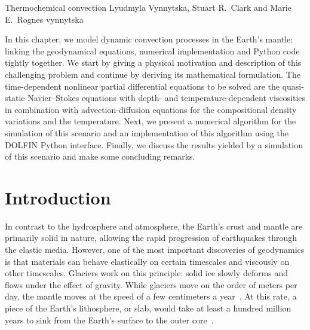               {Thermochemical convection}
              {Lyudmyla Vynnytska,  Stuart R.~Clark and Marie E.~Rognes}
              {vynnytska}

\newcommand{\erf}{\mathrm{erf}}
\newcommand{\expc}{\mathrm{erf}}
\newcommand{\composition}{\phi}
\newcommand{\test}{\psi}
\newcommand{\triang}{\mathcal{T}}
\newcommand{\jump}[1]{[[#1]]}
\newcommand{\avg}[1]{\{#1\}}
\newcommand{\code}[1]{$\texttt{#1}$}

In this chapter, we model dynamic convection processes in the Earth's
mantle: linking the geodynamical equations, numerical implementation
and Python code tightly together. We start by giving a physical
motivation and description of this challenging problem and continue by
deriving its mathematical formulation. The time-dependent nonlinear
partial differential equations to be solved are the quasi-static
Navier--Stokes equations with depth- and temperature-dependent
viscosities in combination with advection-diffusion equations for the
compositional density variations and the temperature. Next, we present
a numerical algorithm for the simulation of this scenario and an
implementation of this algorithm using the DOLFIN Python
interface. Finally, we discuss the results yielded by a simulation of
this scenario and make some concluding remarks.


\section{Introduction}

In contrast to the hydrosphere and atmosphere, the Earth's crust and
mantle are primarily solid in nature, allowing the rapid progression
of earthquakes through the elastic media.  However, one of the most
important discoveries of geodynamics is that materials can behave
elastically on certain timescales and viscously on other
timescales. Glaciers work on this principle: solid ice slowly deforms
and flows under the effect of gravity.  While glaciers move on the
order of meters per day, the mantle moves at the speed of a few
centimeters a year~\citep{vanderMeer2010}.  At this rate, a piece of
the Earth's lithosphere, or slab, would take at least a hundred
million years to sink from the Earth's surface to the outer
core~\citep{Jarvis2007}.

